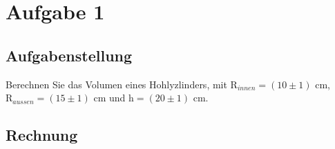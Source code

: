 \section*{Aufgabe 1}
    \subsection*{Aufgabenstellung}
        Berechnen Sie das Volumen eines Hohlyzlinders, mit R$_{innen} = (10 \pm 1)$ cm,\\    
        R$_{aussen}=(15 \pm 1)$ cm und h$=(20 \pm 1)$ cm.

    \subsection*{Rechnung}
